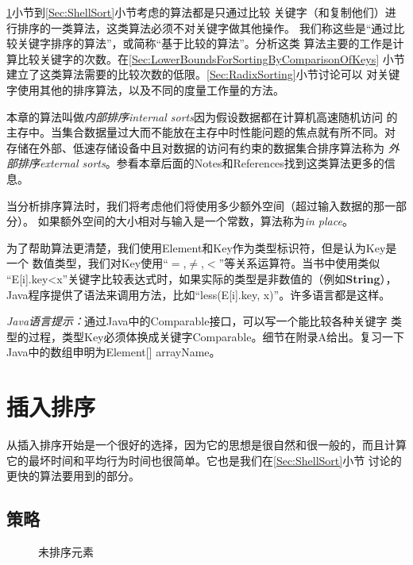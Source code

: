 \ref{Sec:InsertSort}小节到\ref{Sec:ShellSort}小节考虑的算法都是只通过比较
关键字（和复制他们）进行排序的一类算法，这类算法必须不对关键字做其他操作。
我们称这些是“通过比较关键字排序的算法”，或简称“基于比较的算法”。分析这类
算法主要的工作是计算比较关键字的次数。在\ref{Sec:LowerBoundsForSortingByComparisonOfKeys}
小节建立了这类算法需要的比较次数的低限。\ref{Sec:RadixSorting}小节讨论可以
对关键字使用其他的排序算法，以及不同的度量工作量的方法。

本章的算法叫做\emph{内部排序internal sorts}因为假设数据都在计算机高速随机访问
的主存中。当集合数据量过大而不能放在主存中时性能问题的焦点就有所不同。对
存储在外部、低速存储设备中且对数据的访问有约束的数据集合排序算法称为
\emph{外部排序external sorts}。参看本章后面的Notes和References找到这类算法更多的信息。

当分析排序算法时，我们将考虑他们将使用多少额外空间（超过输入数据的那一部分）。
如果额外空间的大小相对与输入是一个常数，算法称为\emph{in place}。

为了帮助算法更清楚，我们使用Element和Key作为类型标识符，但是认为Key是一个
数值类型，我们对Key使用“$=$,$\neq$,$<$”等关系运算符。当书中使用类似
“E[i].key<x”关键字比较表达式时，如果实际的类型是非数值的（例如\textbf{String}），
Java程序提供了语法来调用方法，比如“less(E[i].key, x)”。许多语言都是这样。

\emph{Java语言提示：}通过Java中的Comparable接口，可以写一个能比较各种关键字
类型的过程，类型Key必须体换成关键字Comparable。细节在附录A给出。复习一下
Java中的数组申明为Element[] arrayName。

\section{插入排序}\label{Sec:InsertSort}
从插入排序开始是一个很好的选择，因为它的思想是很自然和很一般的，而且计算
它的最坏时间和平均行为时间也很简单。它也是我们在\ref{Sec:ShellSort}小节
讨论的更快的算法要用到的部分。

\subsection{策略}
\begin{figure*}[!t]
    \centering
    \caption{未排序元素}
    \label{Fig:UnsortedElements}
\end{figure*}

